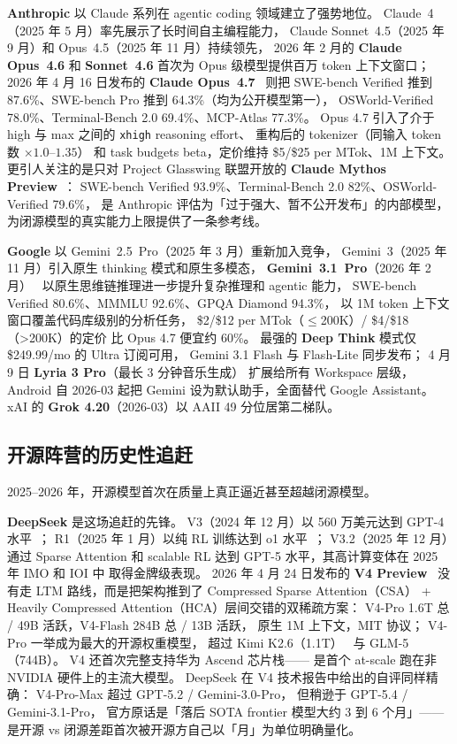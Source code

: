 \textbf{Anthropic} 以 Claude 系列在 agentic coding 领域建立了强势地位。
Claude~4（2025 年 5 月）率先展示了长时间自主编程能力，
Claude Sonnet~4.5（2025 年 9 月）和 Opus~4.5（2025 年 11 月）持续领先，
2026 年 2 月的 \textbf{Claude Opus~4.6} 和 \textbf{Sonnet~4.6}
首次为 Opus 级模型提供百万 token 上下文窗口；
2026 年 4 月 16 日发布的 \textbf{Claude Opus~4.7}~\cite{anthropicopus47}
则把 SWE-bench Verified 推到 87.6\%、SWE-bench Pro 推到 64.3\%（均为公开模型第一），
OSWorld-Verified 78.0\%、Terminal-Bench 2.0 69.4\%、MCP-Atlas 77.3\%。
Opus 4.7 引入了介于 high 与 max 之间的 \texttt{xhigh} reasoning effort、
重构后的 tokenizer（同输入 token 数 $\times 1.0$--$1.35$）
和 task budgets beta，定价维持 \$5/\$25 per MTok、1M 上下文。
更引人关注的是只对 Project Glasswing 联盟开放的
\textbf{Claude Mythos Preview}~\cite{anthropicmythos}：
SWE-bench Verified 93.9\%、Terminal-Bench 2.0 82\%、OSWorld-Verified 79.6\%，
是 Anthropic 评估为「过于强大、暂不公开发布」的内部模型，
为闭源模型的真实能力上限提供了一条参考线。

\textbf{Google} 以 Gemini~2.5~Pro（2025 年 3 月）重新加入竞争，
Gemini~3（2025 年 11 月）引入原生 thinking 模式和原生多模态，
\textbf{Gemini~3.1~Pro}（2026 年 2 月）~\cite{googlegemini31}
以原生思维链推理进一步提升复杂推理和 agentic 能力，
SWE-bench Verified 80.6\%、MMMLU 92.6\%、GPQA Diamond 94.3\%，
以 1M token 上下文窗口覆盖代码库级别的分析任务，
\$2/\$12 per MTok（$\le$200K）/ \$4/\$18（>200K）的定价
比 Opus 4.7 便宜约 60\%。
最强的 \textbf{Deep Think} 模式仅 \$249.99/mo 的 Ultra 订阅可用，
Gemini 3.1 Flash 与 Flash-Lite 同步发布；
4 月 9 日 \textbf{Lyria 3 Pro}（最长 3 分钟音乐生成）
扩展给所有 Workspace 层级，
Android 自 2026-03 起把 Gemini 设为默认助手，全面替代 Google Assistant。
xAI 的 \textbf{Grok 4.20}（2026-03）以 AAII 49 分位居第二梯队。

\subsection{开源阵营的历史性追赶}

2025--2026 年，开源模型首次在质量上真正逼近甚至超越闭源模型。

\textbf{DeepSeek} 是这场追赶的先锋。
V3（2024 年 12 月）以 560 万美元达到 GPT-4 水平~\cite{deepseekv3}；
R1（2025 年 1 月）以纯 RL 训练达到 o1 水平~\cite{deepseekr1}；
V3.2（2025 年 12 月）通过 Sparse Attention 和 scalable RL
达到 GPT-5 水平，其高计算变体在 2025 年 IMO 和 IOI 中
取得金牌级表现。
2026 年 4 月 24 日发布的 \textbf{V4 Preview}~\cite{deepseekv4}
没有走 LTM 路线，而是把架构推到了 Compressed Sparse Attention（CSA）
+ Heavily Compressed Attention（HCA）层间交错的双稀疏方案：
V4-Pro 1.6T 总 / 49B 活跃，V4-Flash 284B 总 / 13B 活跃，
原生 1M 上下文，MIT 协议；
V4-Pro 一举成为最大的开源权重模型，
超过 Kimi K2.6（1.1T）~\cite{kimik26} 与 GLM-5（744B）。
V4 还首次完整支持华为 Ascend 芯片栈——
是首个 at-scale 跑在非 NVIDIA 硬件上的主流大模型。
DeepSeek 在 V4 技术报告中给出的自评同样精确：
V4-Pro-Max 超过 GPT-5.2 / Gemini-3.0-Pro，
但稍逊于 GPT-5.4 / Gemini-3.1-Pro，
官方原话是「落后 SOTA frontier 模型大约 3 到 6 个月」——
是开源 vs 闭源差距首次被开源方自己以「月」为单位明确量化。

